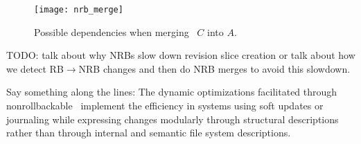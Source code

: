 \begin{figure}[htb]
  \centering
  \texttt{[image: nrb\_merge]}
  \caption{Possible dependencies when merging \chdesc\ $C$ into $A$.}
  \label{fig:nrb-merge}
\end{figure}

TODO: talk about why NRBs slow down revision slice creation or talk
about how we detect RB$\rightarrow$NRB changes and then do NRB merges
to avoid this slowdown.

Say something along the lines:
%
The dynamic optimizations facilitated through nonrollbackable
\chdescs\ implement the efficiency in systems using soft updates or
journaling while expressing
changes modularly through structural descriptions rather than through
internal and semantic file system descriptions.





